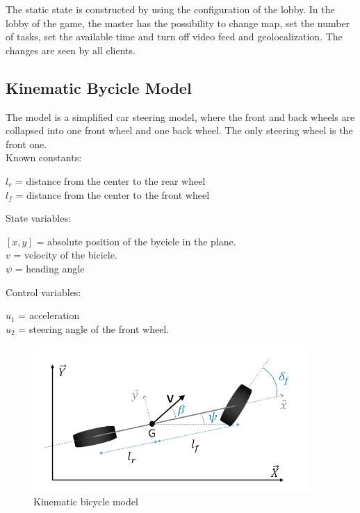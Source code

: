 \documentclass{article}
\begin{document}
\smallskip
The static state is constructed by using the configuration of the lobby. In the lobby of the game, the master has the possibility to change map, set the number of tasks, set the available time and  turn off video feed and geolocalization. The changes are seen by all clients.

\clearpage

\subsection{Kinematic Bycicle Model \cite{kbm}}
The model is a simplified car steering model, where the front and back wheels are collapsed into one front wheel and one back wheel. The only steering wheel is the front one. \\
\smallskip
Known constants:
\begin{center}
\( l_r \) = distance from the center to the rear wheel \\
\( l_f \) = distance from the center to the front wheel \\
\end{center}
State variables:
\begin{center}
\( [x, y] \) = absolute position of the bycicle in the plane. \\
\( v \) = velocity of the bicicle. \\
\( \psi \) = heading angle \\
\end{center}
Control variables:
\begin{center}
\( u_1 \) = acceleration \\
\( u_2 \) = steering angle of the front wheel. \\
\end{center}
\begin{figure}[!h]
\includegraphics[width=\textwidth]{bike}
\caption{Kinematic bicycle model}
\end{figure}
\end{document}
